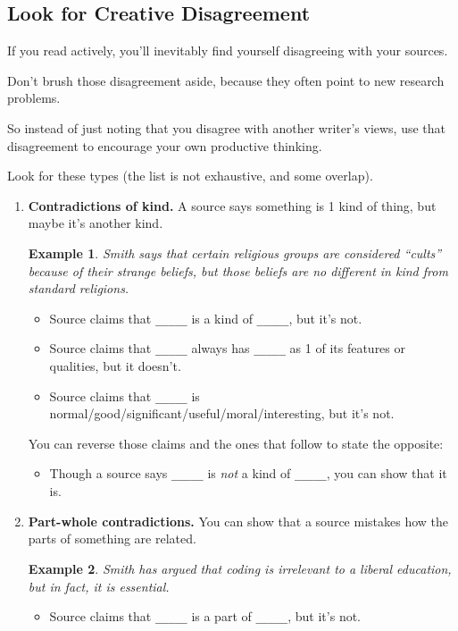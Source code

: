 \documentclass[oneside]{book}
\numberwithin{equation}{section}
\newtheorem{example}{Example}[section]
\begin{document}
\subsection{Look for Creative Disagreement}
If you read actively, you'll inevitably find yourself disagreeing with your sources.

Don't brush those disagreement aside, because they often point to new research problems.

So instead of just noting that you disagree with another writer's views, use that disagreement to encourage your own productive thinking.

Look for these types (the list is not exhaustive, and some overlap).
\begin{enumerate}
    \item \textbf{Contradictions of kind.} A source says something is 1 kind of thing, but maybe it's another kind.
    \begin{example}
        Smith says that certain religious groups are considered ``cults'' because of their strange beliefs, but those beliefs are no different in kind from standard religions.
    \end{example}
    \begin{itemize}
        \item Source claims that \verb|_____| is a kind of \verb|_____|, but it's not.
        \item Source claims that \verb|_____| always has \verb|_____| as 1 of its features or qualities, but it doesn't.
        \item Source claims that \verb|_____| is normal/good/significant/useful/moral/interesting, but it's not.
    \end{itemize}
    You can reverse those claims and the ones that follow to state the opposite:
    \begin{itemize}
        \item Though a source says \verb|_____| is \textit{not} a kind of \verb|_____|, you can show that it is.
    \end{itemize}
    \item \textbf{Part-whole contradictions.} You can show that a source mistakes how the parts of something are related.
    \begin{example}
        Smith has argued that coding is irrelevant to a liberal education, but in fact, it is essential.
    \end{example}
    \begin{itemize}
        \item Source claims that \verb|_____| is a part of \verb|_____|, but it's not.

\end{itemize}
\end{enumerate}
\end{document}
